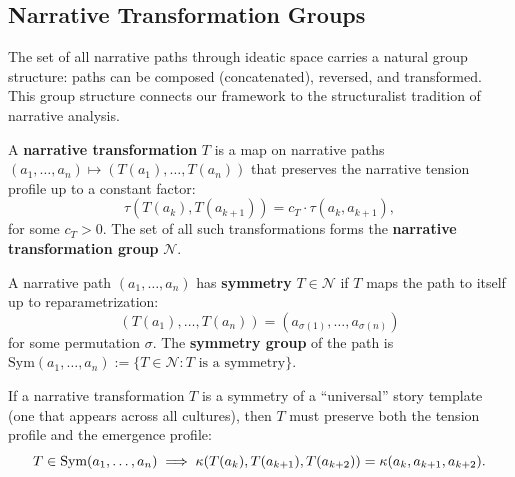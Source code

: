 



\subsection{Narrative Transformation Groups}

The set of all narrative paths through ideatic space carries a natural group
structure: paths can be composed (concatenated), reversed, and transformed.
This group structure connects our framework to the structuralist tradition
of narrative analysis.

\begin{definition}
\label{def:narrative-transform}
A \textbf{narrative transformation} $T$ is a map on narrative paths
$(a_1, \ldots, a_n) \mapsto (T(a_1), \ldots, T(a_n))$ that preserves
the narrative tension profile up to a constant factor:
\[
  \tau(T(a_k), T(a_{k+1})) = c_T \cdot \tau(a_k, a_{k+1}),
\]
for some $c_T > 0$.  The set of all such transformations forms the
\textbf{narrative transformation group} $\mathcal{N}$.
\end{definition}

\begin{definition}
\label{def:narrative-symmetry}
A narrative path $(a_1, \ldots, a_n)$ has \textbf{symmetry}
$T \in \mathcal{N}$ if $T$ maps the path to itself up to
reparametrization:
\[
  (T(a_1), \ldots, T(a_n)) = (a_{\sigma(1)}, \ldots, a_{\sigma(n)})
\]
for some permutation $\sigma$.  The \textbf{symmetry group} of the path
is $\text{Sym}(a_1, \ldots, a_n) := \{T \in \mathcal{N} :
T \text{ is a symmetry}\}$.
\end{definition}

\begin{theorem}
\label{thm:narrative-symmetry}
If a narrative transformation $T$ is a symmetry of a ``universal'' story
template (one that appears across all cultures), then $T$ must preserve
both the tension profile and the emergence profile:
\[
  T \in \text{Sym}(a_1, \ldots, a_n) \;\Longrightarrow\;
  \kappa(T(a_k), T(a_{k+1}), T(a_{k+2}))
  = \kappa(a_k, a_{k+1}, a_{k+2}).
\]
\end{theorem}

